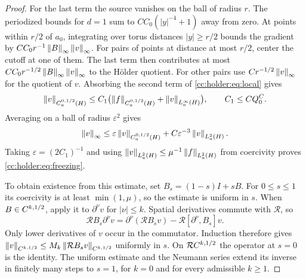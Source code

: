 \begin{proof}
For the last term the source vanishes on the ball of radius $r$.
The periodized bounds for $d=1$ sum to $CC_0(|y|^{-4}+1)$ away from
zero. At points within $r/2$ of $a_0$, integrating over torus distances
$|y|\ge r/2$ bounds the gradient by
$CC_0r^{-1}\left\lVert B\right\rVert_\infty\left\lVert v\right\rVert_\infty$.
For pairs of points at distance at most $r/2$, center the cutoff at one
of them. The last term then contributes at most
$CC_0r^{-1/2}\left\lVert B\right\rVert_\infty\left\lVert v\right\rVert_\infty$ to the H\"older quotient.
For other pairs use $Cr^{-1/2}\left\lVert v\right\rVert_\infty$ for the quotient of $v$.
Absorbing the second term of \eqref{cc:holder:eq:local} gives
\[
 \left\lVert v\right\rVert_{C^{0,1/2}_a(H)}\le C_1
       \bigl(\left\lVert f\right\rVert_{C^{0,1/2}_a(H)}+\left\lVert v\right\rVert_{L^\infty_a(H)}\bigr),
 \qquad C_1\le CQ_0^C.
\]
Averaging on a ball of radius $\varepsilon^2$ gives
\[
 \left\lVert v\right\rVert_\infty\le\varepsilon\left\lVert v\right\rVert_{C^{0,1/2}_a(H)}
       +C\varepsilon^{-3}\left\lVert v\right\rVert_{L^2_a(H)}.
\]
Taking $\varepsilon=(2C_1)^{-1}$ and using
$\left\lVert v\right\rVert_{L^2_a(H)}\le\mu^{-1}\left\lVert f\right\rVert_{L^2_a(H)}$ from coercivity
proves \eqref{cc:holder:eq:freezing}.

To obtain existence from this estimate, set $B_s=(1-s)I+sB$.
For $0\le s\le1$ its coercivity is at least $\min(1,\mu)$, so the
estimate is uniform in $s$. When $B\in C^{k,1/2}$, apply it to
$\partial^\nu v$ for $|\nu|\le k$. Spatial derivatives commute with
$\mathcal R$, so
\[
 \mathcal R B_s\partial^\nu v
 =\partial^\nu(\mathcal R B_s v)-\mathcal R[\partial^\nu,B_s]v .
\]
Only lower derivatives of $v$ occur in the commutator. Induction
therefore gives $\left\lVert v\right\rVert_{C^{k,1/2}}\le M_k\left\lVert\mathcal R B_s v\right\rVert_{C^{k,1/2}}$
uniformly in $s$. On $\mathcal RC^{k,1/2}$ the operator at $s=0$ is
the identity. The uniform estimate and the Neumann series extend its
inverse in finitely many steps to $s=1$, for $k=0$ and for every
admissible $k\ge1$.
\end{proof}

